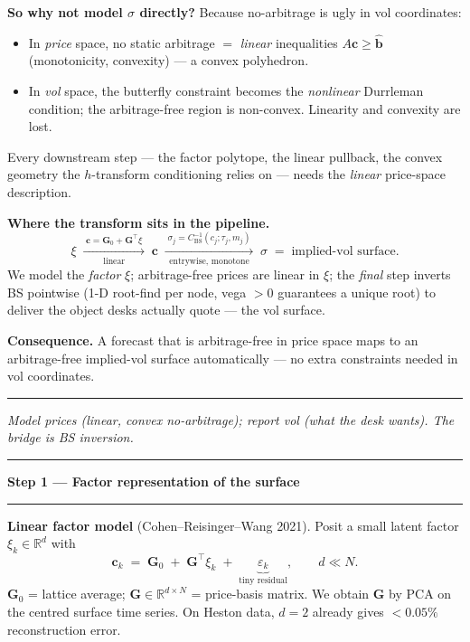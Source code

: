 \documentclass[12pt]{article}
\newcommand{\slide}[1]{%
  \par\noindent\rule{\linewidth}{1.2pt}\par\vspace{2pt}%
  {\LARGE\bfseries #1}\par\vspace{2pt}%
  \noindent\rule{\linewidth}{0.5pt}\par\vspace{8pt}}
\newcommand{\footer}[1]{\vfill\noindent\rule{\linewidth}{0.3pt}\par
  {\small\itshape #1}}
\newcommand{\R}{\mathbb{R}}
\begin{document}
\vspace{6pt}
\textbf{So why not model $\sigma$ directly?} Because no-arbitrage is ugly in
vol coordinates:
\begin{itemize}
\item In \emph{price} space, no static arbitrage $=$ \emph{linear}
  inequalities $A\mathbf c\ge\mathbf{\hat b}$ (monotonicity, convexity) ---
  a convex polyhedron.
\item In \emph{vol} space, the butterfly constraint becomes the
  \emph{nonlinear} Durrleman condition; the arbitrage-free region is
  non-convex. Linearity and convexity are lost.
\end{itemize}
Every downstream step --- the factor polytope, the linear pullback, the
convex geometry the $h$-transform conditioning relies on --- needs the
\emph{linear} price-space description.

\vspace{6pt}
\textbf{Where the transform sits in the pipeline.}
\[
\xi \;\xrightarrow[\text{linear}]{\;\mathbf c=\mathbf G_0+\mathbf G^\top\xi\;}\;
\mathbf c \;\xrightarrow[\text{entrywise, monotone}]{\;\sigma_j=C_{\mathrm{BS}}^{-1}(c_j;\tau_j,m_j)\;}\;
\sigma \;=\; \text{implied-vol surface.}
\]
We model the \emph{factor} $\xi$; arbitrage-free prices are linear in $\xi$;
the \emph{final} step inverts BS pointwise (1-D root-find per node, vega
$>0$ guarantees a unique root) to deliver the object desks actually quote
--- the vol surface.

\vspace{4pt}
\textbf{Consequence.} A forecast that is arbitrage-free in price space maps
to an arbitrage-free implied-vol surface automatically --- no extra
constraints needed in vol coordinates.

\footer{Model prices (linear, convex no-arbitrage); report vol (what the desk wants). The bridge is BS inversion.}
\clearpage

\slide{Step 1 --- Factor representation of the surface}

\textbf{Linear factor model} (Cohen--Reisinger--Wang 2021).
Posit a small latent factor $\xi_k \in \R^d$ with
\[
\mathbf c_k \;=\; \mathbf G_0 \;+\; \mathbf G^\top \xi_k \;+\;
\underbrace{\varepsilon_k}_{\text{tiny residual}},
\qquad d \ll N.
\]
$\mathbf G_0$ = lattice average; $\mathbf G \in \R^{d\times N}$ = price-basis
matrix. We obtain $\mathbf G$ by PCA on the centred surface time series.
On Heston data, $d=2$ already gives $<0.05\%$ reconstruction error.
\end{document}
